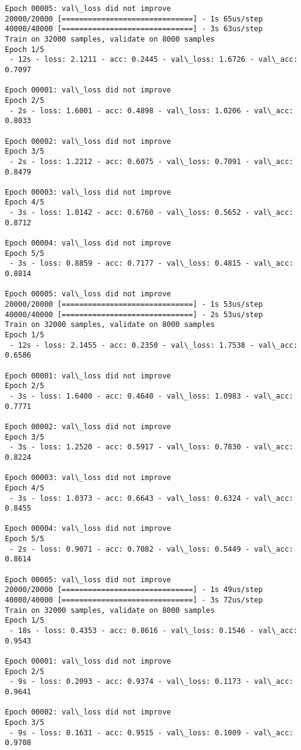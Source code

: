 \documentclass[11pt]{article}
\begin{document}
\begin{Verbatim}[commandchars=\\\{\}]
Epoch 00005: val\_loss did not improve
20000/20000 [==============================] - 1s 65us/step
40000/40000 [==============================] - 3s 63us/step
Train on 32000 samples, validate on 8000 samples
Epoch 1/5
 - 12s - loss: 2.1211 - acc: 0.2445 - val\_loss: 1.6726 - val\_acc: 0.7097

Epoch 00001: val\_loss did not improve
Epoch 2/5
 - 2s - loss: 1.6001 - acc: 0.4898 - val\_loss: 1.0206 - val\_acc: 0.8033

Epoch 00002: val\_loss did not improve
Epoch 3/5
 - 2s - loss: 1.2212 - acc: 0.6075 - val\_loss: 0.7091 - val\_acc: 0.8479

Epoch 00003: val\_loss did not improve
Epoch 4/5
 - 3s - loss: 1.0142 - acc: 0.6760 - val\_loss: 0.5652 - val\_acc: 0.8712

Epoch 00004: val\_loss did not improve
Epoch 5/5
 - 3s - loss: 0.8859 - acc: 0.7177 - val\_loss: 0.4815 - val\_acc: 0.8814

Epoch 00005: val\_loss did not improve
20000/20000 [==============================] - 1s 53us/step
40000/40000 [==============================] - 2s 53us/step
Train on 32000 samples, validate on 8000 samples
Epoch 1/5
 - 12s - loss: 2.1455 - acc: 0.2350 - val\_loss: 1.7538 - val\_acc: 0.6586

Epoch 00001: val\_loss did not improve
Epoch 2/5
 - 3s - loss: 1.6400 - acc: 0.4640 - val\_loss: 1.0983 - val\_acc: 0.7771

Epoch 00002: val\_loss did not improve
Epoch 3/5
 - 3s - loss: 1.2520 - acc: 0.5917 - val\_loss: 0.7830 - val\_acc: 0.8224

Epoch 00003: val\_loss did not improve
Epoch 4/5
 - 3s - loss: 1.0373 - acc: 0.6643 - val\_loss: 0.6324 - val\_acc: 0.8455

Epoch 00004: val\_loss did not improve
Epoch 5/5
 - 2s - loss: 0.9071 - acc: 0.7082 - val\_loss: 0.5449 - val\_acc: 0.8614

Epoch 00005: val\_loss did not improve
20000/20000 [==============================] - 1s 49us/step
40000/40000 [==============================] - 3s 72us/step
Train on 32000 samples, validate on 8000 samples
Epoch 1/5
 - 18s - loss: 0.4353 - acc: 0.8616 - val\_loss: 0.1546 - val\_acc: 0.9543

Epoch 00001: val\_loss did not improve
Epoch 2/5
 - 9s - loss: 0.2093 - acc: 0.9374 - val\_loss: 0.1173 - val\_acc: 0.9641

Epoch 00002: val\_loss did not improve
Epoch 3/5
 - 9s - loss: 0.1631 - acc: 0.9515 - val\_loss: 0.1009 - val\_acc: 0.9708


\end{Verbatim}
\end{document}
